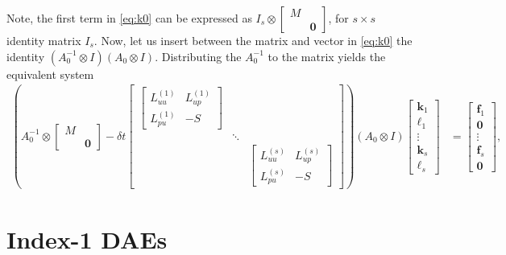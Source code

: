 \documentclass[a4paper,10pt]{article}
\begin{document}
Note, the first term in \eqref{eq:k0} can be expressed as
$I_s \otimes \begin{bmatrix} M \\ & \mathbf{0}\end{bmatrix}$, for $s\times s$
identity matrix $I_s$. Now, let us insert between the matrix and vector in
\eqref{eq:k0} the identity $(A_0^{-1}\otimes I)(A_0\otimes I)$. Distributing the
$A_0^{-1}$ to the matrix yields the equivalent system
%
\begin{align}\label{eq:k1}
\left(A_0^{-1} \otimes \begin{bmatrix} M \\ & \mathbf{0}\end{bmatrix}
	- \delta t \begin{bmatrix} \begin{bmatrix} L^{(1)}_{uu} & L^{(1)}_{up} \\ L^{(1)}_{pu} & -S \end{bmatrix} & \\
	\ & \ddots & \ \\ & & \begin{bmatrix} L^{(s)}_{uu} & L^{(s)}_{up} \\ L^{(s)}_{pu} & -S \end{bmatrix} \end{bmatrix} \right)
	(A_0\otimes I)\begin{bmatrix} \mathbf{k}_1 \\ \ell_1 \\ \vdots \\ \mathbf{k}_s \\ \ell_s\end{bmatrix} 
& = \begin{bmatrix} \mathbf{f}_1 \\ \mathbf{0} \\ \vdots \\ \mathbf{f}_s \\ \mathbf{0} \end{bmatrix},
\end{align}
%

\section{Index-1 DAEs}
\end{document}
